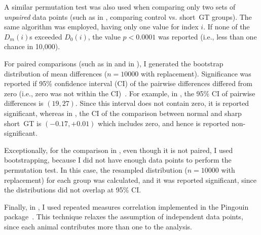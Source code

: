 \par
A similar permutation test was also used when comparing only two sets of \textit{unpaired} data points (such as in , comparing control vs. short~GT groups).
The same algorithm was employed, having only one value for index $i$.
If none of the $D_m(i)$s exceeded $D_0(i)$, the value $p<0.0001$ was reported (i.e., less than one chance in 10,000).
\par
For paired comparisons (such as in  and in ), I generated the bootstrap distribution of mean differences ($n=10000$ with replacement).
Significance was reported if 95\% confidence interval (CI) of the pairwise differences differed from zero (i.e., zero was not within the CI)~\cite{Efron1994}.
For example, in , the 95\% CI of pairwise differences is $(19, 27)$.
Since this interval does not contain zero, it is reported significant, whereas in , the CI of the comparison between normal and sharp short~GT is $(-0.17, +0.01)$ which includes zero, and hence is reported non-significant.
\par
Exceptionally, for the comparison in , even though it is not paired, I used bootstrapping, because I did not have enough data points to perform the permutation test.
In this case, the resampled distribution ($n=10000$ with replacement) for each group was calculated, and it was reported significant, since the distributions did not overlap at 95\% CI.
\par
Finally, in , I used repeated measures correlation implemented in the Pingouin package~\cite{PingouinToolbox}.
This technique relaxes the assumption of independent data points, since each animal contributes more than one to the analysis.
